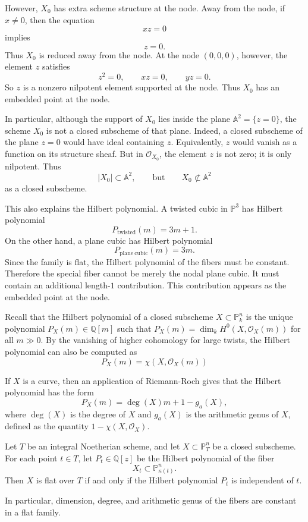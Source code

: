 \documentclass[12pt]{article}
\begin{document}
\begin{example}
    However, $X_0$ has extra scheme structure at the node. Away from the node, if $x\neq 0$, then the equation
    \[
        xz=0
    \]
    implies
    \[
        z=0.
    \]
    Thus $X_0$ is reduced away from the node. At the node $(0,0,0)$, however, the element $z$ satisfies
    \[
        z^2=0,\qquad
        xz=0,\qquad
        yz=0.
    \]
    So $z$ is a nonzero nilpotent element supported at the node. Thus $X_0$ has an embedded point at the node.

    In particular, although the support of $X_0$ lies inside the plane $\mathbb A^2=\{z=0\}$, the scheme $X_0$ is not a closed subscheme of that plane. Indeed, a closed subscheme of the plane $z=0$ would have ideal containing $z$. Equivalently, $z$ would vanish as a function on its structure sheaf. But in $\mathcal O_{X_0}$, the element $z$ is not zero; it is only nilpotent. Thus
    \[
        |X_0|\subset \mathbb A^2,
        \qquad
        \text{but}
        \qquad
        X_0\not\subset \mathbb A^2
    \]
    as a closed subscheme.

    This also explains the Hilbert polynomial. A twisted cubic in $\mathbb P^3$ has Hilbert polynomial
    \[
        P_{\mathrm{twisted}}(m)=3m+1.
    \]
    On the other hand, a plane cubic has Hilbert polynomial
    \[
        P_{\mathrm{plane\ cubic}}(m)=3m.
    \]
    Since the family is flat, the Hilbert polynomial of the fibers must be constant. Therefore the special fiber cannot be merely the nodal plane cubic. It must contain an additional length-$1$ contribution. This contribution appears as the embedded point at the node.
\end{example}

Recall that the Hilbert polynomial of a closed subscheme $X\subset \mathbb P^n_k$ is the unique polynomial $P_X(m)\in \mathbb Q[m]$ such that $P_X(m)=\dim_k H^0(X,\mathcal O_X(m))$ for all $m\gg 0$. By the vanishing of higher cohomology for large twists, the Hilbert polynomial can also be computed as
\[
    P_X(m)=\chi(X,\mathcal O_X(m))\]

If $X$ is a curve, then an application of Riemann-Roch gives that the Hilbert polynomial has the form
\[
    P_X(m)=\deg(X)m+1-g_a(X),
\]
where $\deg(X)$ is the degree of $X$ and $g_a(X)$ is the arithmetic genus of $X$, defined as the quantity $1-\chi(X,\mathcal O_X)$.
\begin{theorem}
    Let $T$ be an integral Noetherian scheme, and let $X\subset \mathbb P^n_T$
    be a closed subscheme. For each point $t\in T$, let $P_t\in \mathbb Q[z]$
    be the Hilbert polynomial of the fiber
    \[
        X_t\subset \mathbb P^n_{\kappa(t)}.
    \]
    Then $X$ is flat over $T$ if and only if the Hilbert polynomial $P_t$ is independent of $t$.
\end{theorem}
In particular, dimension, degree, and arithmetic genus of the fibers are constant in a flat family.
\end{document}
